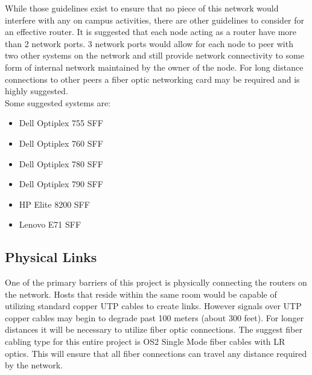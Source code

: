 \documentclass[12pt]{article}
\begin{document}
While those guidelines exist to ensure that no piece of this network would interfere with any on campus activities, there are other guidelines to consider
for an effective router. It is suggested that each node acting as a router have more than 2 network ports. 3 network ports would allow for each node to peer
with two other systems on the network and still provide network connectivity to some form of internal network maintained by the owner of the node. For long
distance connections to other peers a fiber optic networking card may be required and is highly suggested.
\\

Some suggested systems are:

\begin{itemize}
	\item Dell Optiplex 755 SFF
	\item Dell Optiplex 760 SFF
	\item Dell Optiplex 780 SFF
	\item Dell Optiplex 790 SFF
	\item HP Elite 8200 SFF
	\item Lenovo E71 SFF
\end{itemize}

\subsection{Physical Links}

One of the primary barriers of this project is physically connecting the routers on the network. Hosts that reside within the same room would be capable
of utilizing standard copper UTP cables to create links. However signals over UTP copper cables may begin to degrade past 100 meters (about 300 feet). 
For longer distances it will be necessary to utilize fiber optic connections. The suggest fiber cabling type for this entire project is OS2 Single Mode
fiber cables with LR optics. This will ensure that all fiber connections can travel any distance required by the network. 
\end{document}
